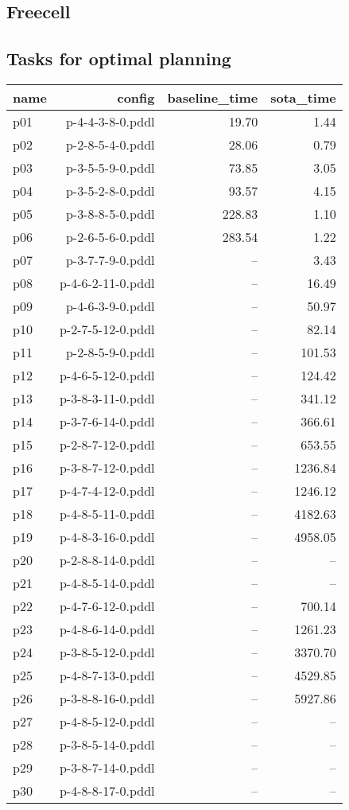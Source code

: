 \documentclass{article}
\begin{document}
                    
                \newpage \subsection{Freecell}
                    \subsection*{Tasks for optimal planning}
                    
                            \begin{center}
                            \scriptsize
                            \begin{tabular}{@{}l|r|r|r@{}}
                            name & config & baseline\_time & sota\_time\\\midrule
                              p01& p-4-4-3-8-0.pddl&19.70&1.44\\
  p02& p-2-8-5-4-0.pddl&28.06&0.79\\
  p03& p-3-5-5-9-0.pddl&73.85&3.05\\
  p04& p-3-5-2-8-0.pddl&93.57&4.15\\
  p05& p-3-8-8-5-0.pddl&228.83&1.10\\
  p06& p-2-6-5-6-0.pddl&283.54&1.22\\
  p07& p-3-7-7-9-0.pddl&--&3.43\\
  p08& p-4-6-2-11-0.pddl&--&16.49\\
  p09& p-4-6-3-9-0.pddl&--&50.97\\
  p10& p-2-7-5-12-0.pddl&--&82.14\\
  p11& p-2-8-5-9-0.pddl&--&101.53\\
  p12& p-4-6-5-12-0.pddl&--&124.42\\
  p13& p-3-8-3-11-0.pddl&--&341.12\\
  p14& p-3-7-6-14-0.pddl&--&366.61\\
  p15& p-2-8-7-12-0.pddl&--&653.55\\
  p16& p-3-8-7-12-0.pddl&--&1236.84\\
  p17& p-4-7-4-12-0.pddl&--&1246.12\\
  p18& p-4-8-5-11-0.pddl&--&4182.63\\
  p19& p-4-8-3-16-0.pddl&--&4958.05\\
  p20& p-2-8-8-14-0.pddl&--&--\\
  p21& p-4-8-5-14-0.pddl&--&--\\
  p22& p-4-7-6-12-0.pddl&--&700.14\\
  p23& p-4-8-6-14-0.pddl&--&1261.23\\
  p24& p-3-8-5-12-0.pddl&--&3370.70\\
  p25& p-4-8-7-13-0.pddl&--&4529.85\\
  p26& p-3-8-8-16-0.pddl&--&5927.86\\
  p27& p-4-8-5-12-0.pddl&--&--\\
  p28& p-3-8-5-14-0.pddl&--&--\\
  p29& p-3-8-7-14-0.pddl&--&--\\
  p30& p-4-8-8-17-0.pddl&--&--
                            \end{tabular}
                            \end{center}
                    
\end{document}
